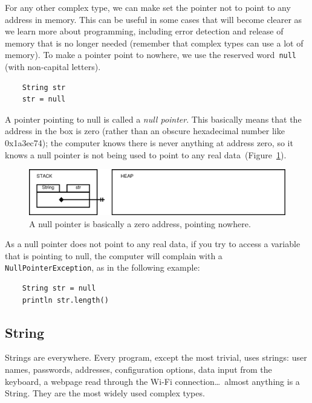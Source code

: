 For any other complex type, we can make set the pointer 
not to point to any address in memory. This can be useful in
some cases that will become clearer as we learn more about
programming, including error detection and release of memory that is
no longer needed (remember that complex types can use a lot of
memory). To make a pointer point to nowhere, we use the
reserved word~\verb+null+ (with non-capital letters).

\begin{verbatim}
    String str
    str = null
\end{verbatim}

A pointer pointing to null is called a \emph{null pointer}. This
basically means that the address in the box is zero (rather than an
obscure hexadecimal number like 0x1a3ec74); the computer
knows there is never anything at address zero, so it knows a null
pointer is not being used to point to any real
data~(Figure~\ref{fig:nullpiounter}).

\begin{figure}[htbp]
  \centering
  \includegraphics[width=\textwidth]{gfx/variables-string-null}
  \caption{A null pointer is basically a zero address, pointing nowhere.}
  \label{fig:nullpiounter}
\end{figure}

As a null pointer does not point to any real data, if you try to
access a variable that is pointing to null, the computer will complain
with a \verb+NullPointerException+, as in the following example: 

\begin{verbatim}
    String str = null
    println str.length()
\end{verbatim}



\subsection{String}
\label{sec:string}

Strings are everywhere. Every program, except the most trivial, uses
strings: user names, passwords, addresses, configuration options, data
input from the keyboard, a webpage read through the Wi-Fi
connection\ldots~almost anything is a String. They are the most widely
used complex types. 

